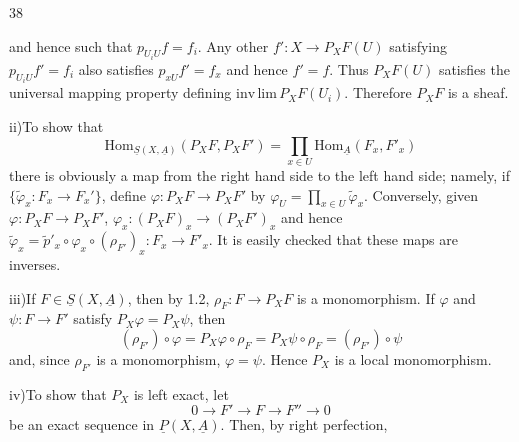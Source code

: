 \hfill 38

and hence such that $p_{U_iU}f=f_i$. Any other
$f':X\longrightarrow P_XF(U)$ satisfying $p_{U_iU}f'=f_i$ also satisfies
$p_{xU}f'=f_x$ and hence $f'=f$.
Thus $P_XF(U)$ satisfies the universal mapping property defining
$\mathrm{inv\,lim}\,P_XF(U_i)$. Therefore $P_XF$ is a sheaf.

ii)\quad To show that
\[
\mathrm{Hom}_{\underline S(X,\underline A)}(P_XF,P_XF')
=\prod_{x\in U}\mathrm{Hom}_{\underline A}(F_x,F'_x)
\]
there is obviously a map from the right hand side to the left hand side;
namely, if $\{\tilde\varphi_x:F_x\longrightarrow F_x'\}$, define
$\varphi:P_XF\longrightarrow P_XF'$ by
$\varphi_U=\prod_{x\in U}\tilde\varphi_x$.
Conversely, given $\varphi:P_XF\longrightarrow P_XF'$,
$\varphi_x:(P_XF)_x\longrightarrow(P_XF')_x$ and hence
$\tilde\varphi_x=\tilde p'_x\circ\varphi_x\circ(\rho_{F'})_x:
F_x\longrightarrow F'_x$.
It is easily checked that these maps are inverses.

iii)\quad If $F\in\underline S(X,\underline A)$, then by 1.2,
$\rho_F:F\longrightarrow P_XF$ is a monomorphism.
If $\varphi$ and $\psi:F\longrightarrow F'$ satisfy $P_X\varphi=P_X\psi$,
then
\[
(\rho_{F'})\circ\varphi=P_X\varphi\circ\rho_F
=P_X\psi\circ\rho_F=(\rho_{F'})\circ\psi
\]
and, since $\rho_{F'}$ is a monomorphism, $\varphi=\psi$.
Hence $P_X$ is a local monomorphism.

iv)\quad To show that $P_X$ is left exact, let
\[
0\longrightarrow F'\longrightarrow F\longrightarrow F''\longrightarrow0
\]
be an exact sequence in $\underline P(X,\underline A)$.
Then, by right perfection,

